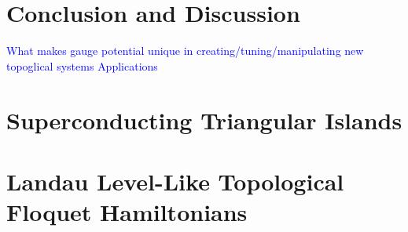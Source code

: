 \documentclass[12pt,doctor]{thesis}
\newcommand{\Blue}[1]{\textcolor{blue}{#1}}
\begin{document}

%
%




\chapter{Conclusion and Discussion}

  \Blue{What makes gauge potential unique in creating/tuning/manipulating new topoglical systems}
  \Blue{Applications}


\begin{appendices}


\chapter{Superconducting Triangular Islands}


%

\chapter{Landau Level-Like Topological Floquet Hamiltonians}






\end{appendices}



\end{document}
